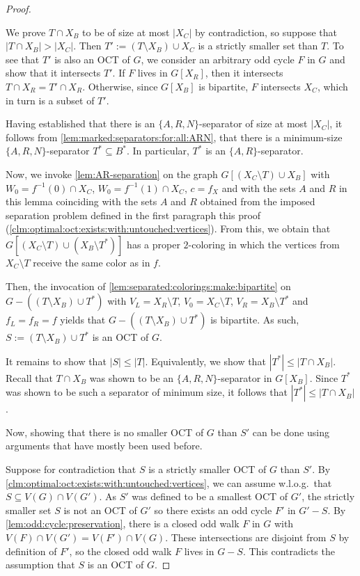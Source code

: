 \begin{proof}
\begin{claimproof}
		We prove $T \cap X_B$ to be of size at most $|X_C|$ by contradiction, so suppose that $|T \cap X_B| > |X_C|$. Then $T' := (T \setminus X_B) \cup X_C$ is a strictly smaller set than $T$. To see that $T'$ is also an OCT of $G$, we consider an arbitrary odd cycle $F$ in $G$ and show that it intersects $T'$. If $F$ lives in $G[X_R]$, then it intersects $T \cap X_R = T' \cap X_R$. Otherwise, since $G[X_B]$ is bipartite, $F$ intersects $X_C$, which in turn is a subset of $T'$.
		
		Having established that there is an $\{A, R, N\}$-separator of size at most $|X_C|$, it follows from \cref{lem:marked:separators:for:all:ARN}, that there is a minimum-size $\{A, R, N\}$-separator $T^\ast \subseteq B^\ast$. In particular, $T^\ast$ is an $\{A,R\}$-separator.
		
		Now, we invoke \cref{lem:AR-separation} on the graph $G[(X_C \setminus T) \cup X_B]$ with $W_0 = f^{-1}(0) \cap X_C$, $W_0 = f^{-1}(1) \cap X_C$, $c = f_X$ and with the sets $A$ and $R$ in this lemma coinciding with the sets $A$ and $R$ obtained from the imposed separation problem defined in the first paragraph this proof (\cref{clm:optimal:oct:exists:with:untouched:vertices}). From this, we obtain that $G[(X_C \setminus T) \cup (X_B \setminus T^\ast)]$ has a proper $2$-coloring in which the vertices from $X_C \setminus T$ receive the same color as in $f$. 
		
		Then, the invocation of \cref{lem:separated:colorings:make:bipartite} on $G - ((T \setminus X_B) \cup T^\ast)$ with $V_L = X_R \setminus T$, $V_0 = X_C \setminus T$, $V_R = X_B \setminus T^\ast$ and $f_L = f_R = f$ yields that $G - ((T \setminus X_B) \cup T^\ast)$ is bipartite. As such, $S := (T \setminus X_B) \cup T^\ast$ is an OCT of $G$.
		
		It remains to show that $|S| \leq |T|$. Equivalently, we show that $|T^\ast| \leq |T \cap X_B|$. Recall that $T \cap X_B$ was shown to be an $\{A, R, N\}$-separator in $G[X_B]$. Since $T^\ast$ was shown to be such a separator of minimum size, it follows that $|T^\ast| \leq |T \cap X_B|$.
	\end{claimproof}
	Now, showing that there is no smaller OCT of $G$ than $S'$ can be done using arguments that have mostly been used before. 
	
	Suppose for contradiction that $S$ is a strictly smaller OCT of $G$ than $S'$. By \cref{clm:optimal:oct:exists:with:untouched:vertices}, we can assume w.l.o.g.~that $S \subseteq V(G) \cap V(G')$. As $S'$ was defined to be a smallest OCT of $G'$, the strictly smaller set $S$ is not an OCT of $G'$ so there exists an odd cycle $F'$ in $G' - S$. By \cref{lem:odd:cycle:preservation}, there is a closed odd walk $F$ in $G$ with $V(F) \cap V(G') = V(F') \cap V(G)$. These intersections are disjoint from $S$ by definition of $F'$, so the closed odd walk $F$ lives in $G - S$. This contradicts the assumption that $S$ is an OCT of $G$.
\end{proof}